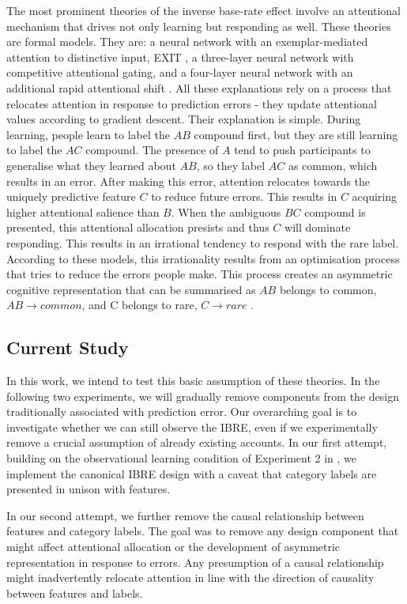 \documentclass[10pt,letterpaper]{article}
\begin{document}
The most prominent theories of the inverse base-rate effect involve an attentional mechanism that drives not only learning but responding as well.
These theories are formal models.
They are: a neural network with an exemplar-mediated attention to distinctive input, EXIT \cite{kruschke2001toward}, a three-layer neural network with competitive attentional gating, and a four-layer neural network with an additional rapid attentional shift \cite{paskewitz2020dissecting}.
All these explanations rely on a process that relocates attention in response to prediction errors - they update attentional values according to gradient descent.
Their explanation is simple.
During learning, people learn to label the $AB$ compound first, but they are still learning to label the $AC$ compound.
The presence of $A$ tend to push participants to generalise what they learned about $AB$, so they label $AC$ as common, which results in an error.
After making this error, attention relocates towards the uniquely predictive feature $C$ to reduce future errors.
This results in $C$ acquiring higher attentional salience than $B$.
When the ambiguous $BC$ compound is presented, this attentional allocation presists and thus $C$ will dominate responding.
This results in an irrational tendency to respond with the rare label.
According to these models, this irrationality results from an optimisation process that tries to reduce the errors people make.
This process creates an asymmetric cognitive representation that can be summarised as $AB$ belongs to common, $AB \to common$, and C belongs to rare, $C \to rare$ \cite{kruschke2001inverse}.

\subsection{Current Study}

In this work, we intend to test this basic assumption of these theories.
In the following two experiments, we will gradually remove components from the design traditionally associated with prediction error.
Our overarching goal is to investigate whether we can still observe the IBRE, even if we experimentally remove a crucial assumption of already existing accounts.
In our first attempt, building on the observational learning condition of Experiment 2 in , we implement the canonical IBRE design with a caveat that category labels are presented in unison with features.

In our second attempt, we further remove the causal relationship between features and category labels.
The goal was to remove any design component that might affect attentional allocation or the development of asymmetric representation in response to errors.
Any presumption of a causal relationship might inadvertently relocate attention in line with the direction of causality between features and labels.
\end{document}
